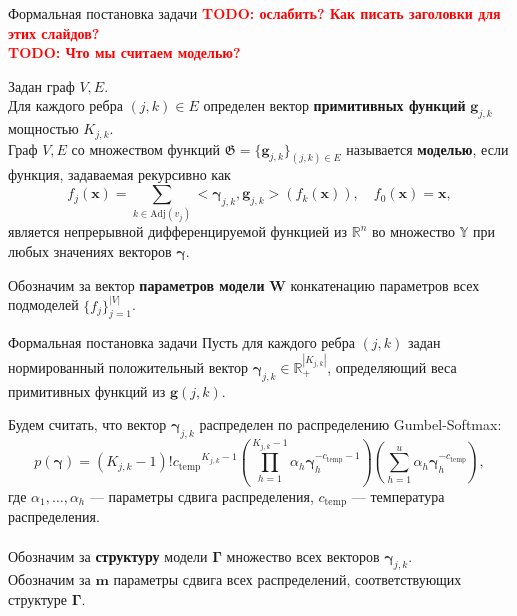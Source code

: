 \documentclass[usenames,dvipsnames,11pt,pdf,utf8,russian,aspectratio=169]{beamer}
\begin{document}
\begin{frame}{Формальная постановка задачи}
\textcolor{red}{\textbf{TODO: ослабить? Как писать заголовки для этих слайдов?\\}}
\textcolor{red}{\textbf{TODO: Что мы считаем моделью?\\}}

Задан граф $V,E$. \\
Для каждого ребра $(j,k) \in E$ определен вектор \textbf{примитивных функций} $\mathbf{g}_{j,k}$ мощностью $K_{j,k}$.\\
Граф $V, E$ со множеством функций $\mathfrak{G} = \{\mathbf{g}_{j,k}\}_{(j,k) \in E}$ называется \textbf{моделью}, если функция, задаваемая рекурсивно как 
\[
    f_j(\mathbf{x}) = \sum_{k \in \text{Adj}(v_j)} <\boldsymbol{\gamma}_{j,k}, \mathbf{g}_{j,k}> (f_{k}(\mathbf{x})), \quad     f_0(\mathbf{x}) = \mathbf{x},
\]
является непрерывной дифференцируемой функцией из $\mathbb{R}^n$ во множество $\mathbb{Y}$ при любых значениях векторов $\boldsymbol{\gamma}$.

Обозначим за вектор \textbf{параметров модели}  $\mathbf{W}$ конкатенацию параметров всех подмоделей $\{f_j\}_{j=1}^{|V|}$.
\end{frame}


\begin{frame}{Формальная постановка задачи}
Пусть для каждого ребра $(j,k)$ задан нормированный положительный вектор $\boldsymbol{\gamma}_{j,k} \in \mathbb{R}_{+}^{|K_{j,k}|}$, определяющий веса примитивных функций из  $\mathbf{g}(j,k)$.

Будем считать, что вектор $\boldsymbol{\gamma}_{j,k}$ распределен по распределению Gumbel-Softmax:
\[
    p(\boldsymbol{\gamma}) = (K_{j,k}-1)!{c_{\text{temp}}}^{K_{j,k}-1}\left(\prod_{h=1}^{K_{j,k}-1} \alpha_h \boldsymbol{\gamma}_h^{-c_{\text{temp}}-1}\right)\left(\sum_{h=1}^u\alpha_h\boldsymbol{\gamma}_h^{-c_{\text{temp}}}\right),
\] 
где $\alpha_1,\dots,\alpha_h$ --- параметры сдвига распределения, $c_{\text{temp}}$ --- температура распределения. 
\\~\\
Обозначим за \textbf{структуру} модели $\boldsymbol{\Gamma}$ множество всех векторов $\boldsymbol{\gamma}_{j,k}$.\\
Обозначим за $\mathbf{m}$ параметры сдвига всех распределений, соответствующих структуре $\boldsymbol{\Gamma}$.

\end{frame}
\end{document}
